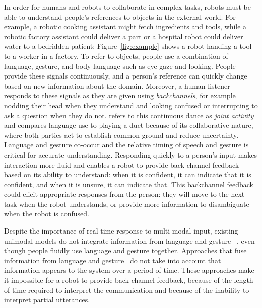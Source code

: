 \documentclass[letterpaper, 10 pt, conference]{ieeeconf}
\begin{document}
In order for humans and robots to collaborate in complex tasks, robots
must be able to understand people's references to objects in the
external world.  For example, a robotic cooking assistant might fetch
ingredients and tools, while a robotic factory assistant could deliver
a part or a hospital robot could deliver water to a bedridden patient;
Figure~\ref{fig:example} shows a robot handing a tool to a worker in a
factory.  To refer to objects, people use a combination of language,
gesture, and body language such as eye gaze and looking.  People
provide these signals continuously, and a person's reference can
quickly change based on new information about the domain.  Moreover, a
human listener responds to these signals as they are given using {\em
  backchannels}, for example nodding their head when they understand
and looking confused or interrupting to ask a question when they do
not.  \citet{clark96} refers to this continuous dance as {\em joint
  activity} and compares language use to playing a duet because of its
collaborative nature, where both parties act to establish common
ground and reduce uncertainty.  Language and gesture co-occur and the
relative timing of speech and gesture is critical for accurate
understanding.  Responding quickly to a person's input makes
interaction more fluid and enables a robot to provide back-channel
feedback based on its ability to understand: when it is confident, it
can indicate that it is confident, and when it is unsure, it can
indicate that.  This backchannel feedback could elicit appropriate
responses from the person: they will move to the next task when the
robot understands, or provide more information to disambiguate when
the robot is confused.


Despite the importance of real-time response to multi-modal input,
existing unimodal models do not integrate information from language
and gesture~\citep{matuszek14, tellex11, kollar10} , even though
people fluidly use language and gesture together.  Approaches that
fuse information from language and gesture~\citep{matuszek14} do not
take into account that information appears to the system over a period
of time.  These approaches make it impossible for a robot to provide
back-channel feedback, because of the length of time required to
interpret the communication and because of the inability to interpret
partial utterances.
\end{document}
